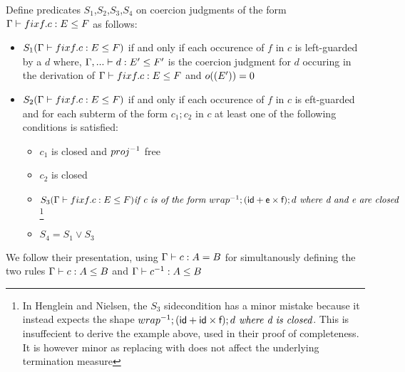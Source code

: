 \documentclass[a4paper,UKenglish,cleveref, autoref, thm-restate]{lipics-v2021}
\begin{document}
\begin{definition}
 Define predicates $S_1$,$S_2$,$S_3$,$S_4$ on coercion judgments of the form $\containsG{\fix f. c}{E}{F}$ as follows:
 \begin{itemize}
 \item $S_1(\containsG{\fix f. c}{E}{F})$ if and only if each occurence of $f$ in $c$ is left-guarded by a $d$ where, $\contains{\Gamma ,...}{d}{E'}{F'}$ is the coercion judgment for $d$ occuring in the derivation of $\containsG{\fix f. c}{E}{F}$ and $o((E'))=0$\\
 \item $S_2(\containsG{\fix f. c}{E}{F})$ if and only if each occurence of $f$ in $c$ is eft-guarded and for each subterm of the form $c_1;c_2$ in $c$ at least one of the following conditions is satisfied:
   \begin{itemize}
   \item $c_1$ is closed and $\dslcominv{proj}$ free
     \item $c_2$ is closed
\item $S_3(\containsG{\fix f. c}{E}{F}) \textit{if c is of the form } \dslcominv{wrap};(\dslcom{id}+\dslcom{e} \times \dslcom{f});d \textit{ where d and e are closed}$ \footnote{In Henglein and Nielsen, the $S_3$ sidecondition has a minor mistake because it instead expects the shape $\dslcominv{wrap};(\dslcom{id}+\dslcom{id} \times \dslcom{f});d \textit{ where d is closed}$. This is insuffecient to derive the example above, used in their proof of completeness. It is however minor as replacing  with  does not affect the underlying termination measure}
\item $S_4 = S_1 \lor S_3$
   \end{itemize}
 \end{itemize}
\end{definition}
We follow their presentation, using $\myaxiomC{c}{A}{B}$ for simultanously defining the two rules  $\containsG{c}{A}{B}$ and  $\containsG{c^{-1}}{A}{B}$
\end{document}
